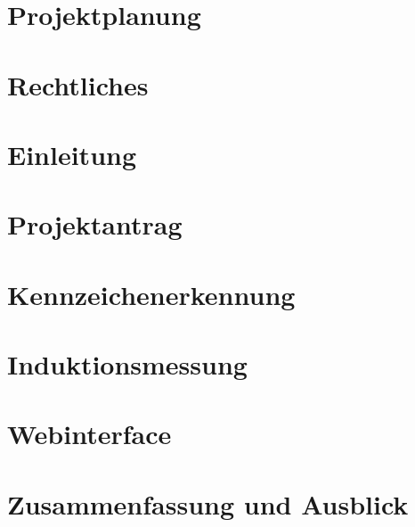 \documentclass[hidelinks,12pt,a4paper,twoside]{article}
\begin{document}
\section{Projektplanung}
\pagebreak


\section{Rechtliches}
\pagebreak


\section{Einleitung}

\pagebreak


\section{Projektantrag}

\pagebreak


\section{Kennzeichenerkennung}

\pagebreak


\section{Induktionsmessung}

\pagebreak


\section{Webinterface}

\pagebreak


\section{Zusammenfassung und Ausblick}

\pagebreak


%


%
\end{document}
